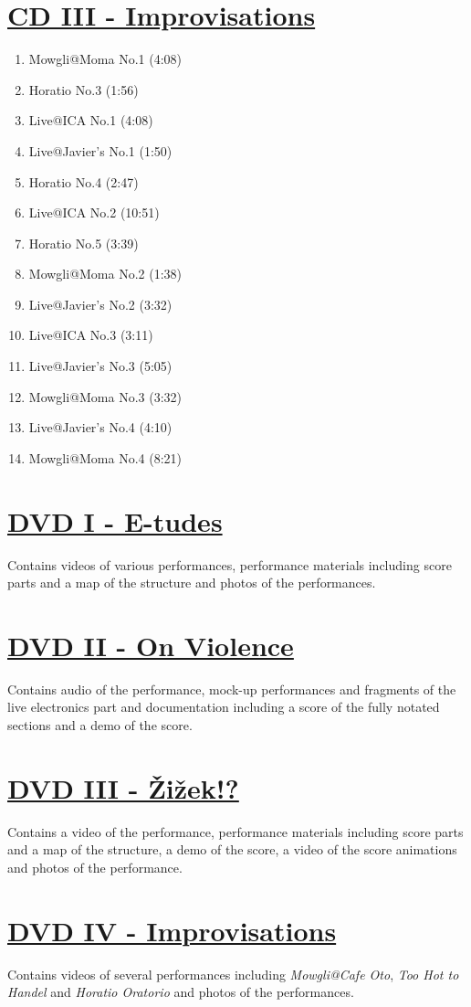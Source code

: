 \section*{\href{http://phd.federicoreuben.com/contents/audio/improvisations}{CD III - Improvisations}}

\begin{enumerate}
\item Mowgli@Moma No.1 (4:08)
\item Horatio No.3 (1:56)
\item Live@ICA No.1 (4:08)
\item Live@Javier's No.1 (1:50)
\item Horatio No.4 (2:47)
\item Live@ICA No.2 (10:51)
\item Horatio No.5 (3:39)
\item Mowgli@Moma No.2 (1:38)
\item Live@Javier's No.2 (3:32)
\item Live@ICA No.3 (3:11)
\item Live@Javier's No.3 (5:05)
\item Mowgli@Moma No.3 (3:32)
\item Live@Javier's No.4 (4:10)
\item Mowgli@Moma No.4 (8:21)
\end{enumerate}

\section*{\href{http://phd.federicoreuben.com/etudes}{DVD I - E-tudes}}

Contains videos of various performances, performance materials including score parts and a map of the structure and photos of the performances.

\section*{\href{http://phd.federicoreuben.com/onviolence}{DVD II - On Violence}}

Contains audio of the performance, mock-up performances and fragments of the live electronics part and documentation including a score of the fully notated sections and a demo of the score.

\section*{\href{http://phd.federicoreuben.com/zizek}{DVD III - \v{Z}i\v{z}ek!?}}

Contains a video of the performance, performance materials including score parts and a map of the structure, a demo of the score, a video of the score animations and photos of the performance.

\section*{\href{http://phd.federicoreuben.com/improvisations}{DVD IV - Improvisations}}

Contains videos of several performances including \emph{Mowgli@Cafe Oto}, \emph{Too Hot to Handel} and \emph{Horatio Oratorio} and photos of the performances.
